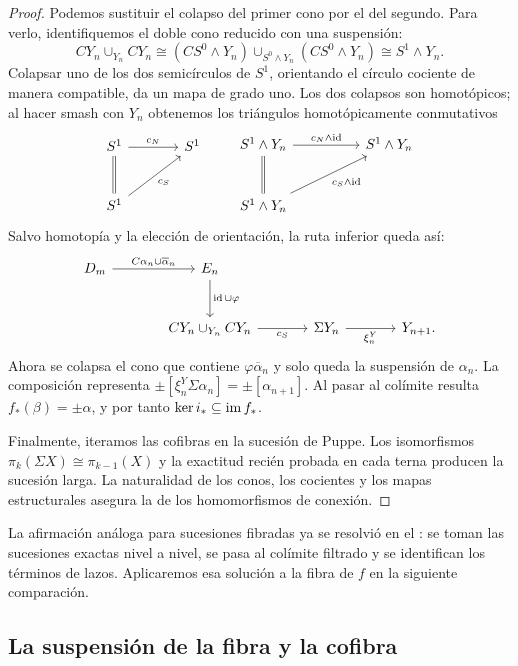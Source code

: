 \begin{proof}
Podemos sustituir el colapso del primer cono por el del segundo. Para verlo, identifiquemos el doble cono reducido con una suspensión:
\[
CY_n\cup_{Y_n}CY_n
\cong (CS^0\wedge Y_n)\cup_{S^0\wedge Y_n}(CS^0\wedge Y_n)
\cong S^1\wedge Y_n.
\]
Colapsar uno de los dos semicírculos de $S^1$, orientando el círculo cociente de manera compatible, da un mapa de grado uno. Los dos colapsos son homotópicos; al hacer smash con $Y_n$ obtenemos los triángulos homotópicamente conmutativos
\[
\begin{tikzcd}[column sep=large,row sep=large]
S^1\arrow[r,"c_N"]\arrow[d,equal]&S^1\\
S^1\arrow[ur,"c_S"']&
\end{tikzcd}
\qquad
\begin{tikzcd}[column sep=huge,row sep=large]
S^1\wedge Y_n\arrow[r,"c_N\wedge\id"]\arrow[d,equal]&S^1\wedge Y_n\\
S^1\wedge Y_n\arrow[ur,"c_S\wedge\id"']&
\end{tikzcd}
\]
Salvo homotopía y la elección de orientación, la ruta inferior queda así:
\[
\begin{tikzcd}[column sep=large,row sep=large]
D_m\arrow[r,"C\alpha_n\cup\overline\alpha_n"]&E_n\arrow[d,"\id\cup\varphi"]&&\\
&CY_n\cup_{Y_n}CY_n\arrow[r,"c_S"']&\Sigma Y_n\arrow[r,"\xi_n^Y"']&Y_{n+1}.
\end{tikzcd}
\]
Ahora se colapsa el cono que contiene $\varphi\overline\alpha_n$ y solo queda la suspensión de $\alpha_n$. La composición representa $\pm[\xi_n^Y\Sigma\alpha_n]=\pm[\alpha_{n+1}]$. Al pasar al colímite resulta $f_*(\beta)=\pm\alpha$, y por tanto $\ker i_*\subseteq\operatorname{im} f_*$.

Finalmente, iteramos las cofibras en la sucesión de Puppe. Los isomorfismos $\pi_k(\Sigma X)\cong\pi_{k-1}(X)$ y la exactitud recién probada en cada terna producen la sucesión larga. La naturalidad de los conos, los cocientes y los mapas estructurales asegura la de los homomorfismos de conexión.
\end{proof}

La afirmación análoga para sucesiones fibradas ya se resolvió en el : se toman las sucesiones exactas nivel a nivel, se pasa al colímite filtrado y se identifican los términos de lazos. Aplicaremos esa solución a la fibra de $f$ en la siguiente comparación.

\subsection{La suspensión de la fibra y la cofibra}

